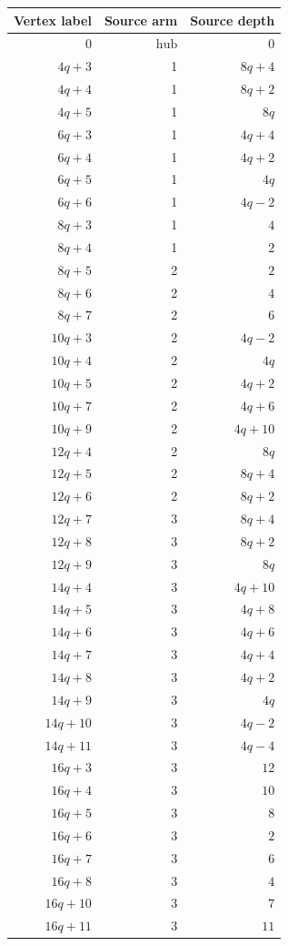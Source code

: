 \begin{longtable}{rrr}
Vertex label & Source arm & Source depth\\\hline\endhead
$0$ & $\mathrm{hub}$ & $0$\\
$4q+3$ & 1 & $8q+4$\\
$4q+4$ & 1 & $8q+2$\\
$4q+5$ & 1 & $8q$\\
$6q+3$ & 1 & $4q+4$\\
$6q+4$ & 1 & $4q+2$\\
$6q+5$ & 1 & $4q$\\
$6q+6$ & 1 & $4q-2$\\
$8q+3$ & 1 & $4$\\
$8q+4$ & 1 & $2$\\
$8q+5$ & 2 & $2$\\
$8q+6$ & 2 & $4$\\
$8q+7$ & 2 & $6$\\
$10q+3$ & 2 & $4q-2$\\
$10q+4$ & 2 & $4q$\\
$10q+5$ & 2 & $4q+2$\\
$10q+7$ & 2 & $4q+6$\\
$10q+9$ & 2 & $4q+10$\\
$12q+4$ & 2 & $8q$\\
$12q+5$ & 2 & $8q+4$\\
$12q+6$ & 2 & $8q+2$\\
$12q+7$ & 3 & $8q+4$\\
$12q+8$ & 3 & $8q+2$\\
$12q+9$ & 3 & $8q$\\
$14q+4$ & 3 & $4q+10$\\
$14q+5$ & 3 & $4q+8$\\
$14q+6$ & 3 & $4q+6$\\
$14q+7$ & 3 & $4q+4$\\
$14q+8$ & 3 & $4q+2$\\
$14q+9$ & 3 & $4q$\\
$14q+10$ & 3 & $4q-2$\\
$14q+11$ & 3 & $4q-4$\\
$16q+3$ & 3 & $12$\\
$16q+4$ & 3 & $10$\\
$16q+5$ & 3 & $8$\\
$16q+6$ & 3 & $2$\\
$16q+7$ & 3 & $6$\\
$16q+8$ & 3 & $4$\\
$16q+10$ & 3 & $7$\\
$16q+11$ & 3 & $11$\\

\end{longtable}
